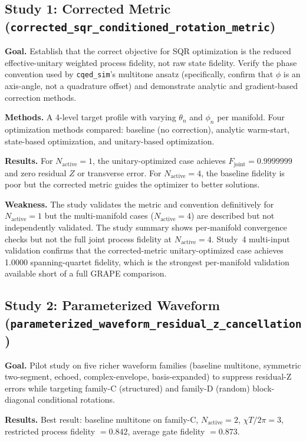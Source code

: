 \documentclass[11pt,letterpaper]{article}
\newcommand{\chiT}{\chi T / 2\pi}
\newcommand{\nact}{N_{\text{active}}}
\begin{document}
\subsection{Study 1: Corrected Metric (\texttt{corrected\_sqr\_conditioned\_rotation\_metric})}

\textbf{Goal.} Establish that the correct objective for SQR optimization is the
reduced effective-unitary weighted process fidelity, not raw state fidelity.
Verify the phase convention used by \texttt{cqed\_sim}'s multitone ansatz
(specifically, confirm that $\phi$ is an axis-angle, not a quadrature offset)
and demonstrate analytic and gradient-based correction methods.

\textbf{Methods.} A 4-level target profile with varying $\theta_n$ and $\phi_n$ per manifold.
Four optimization methods compared: baseline (no correction), analytic warm-start,
state-based optimization, and unitary-based optimization.

\textbf{Results.}  For $\nact = 1$, the unitary-optimized case achieves
$F_\text{joint} = 0.9999999$ and zero residual $Z$ or transverse error.
For $\nact = 4$, the baseline fidelity is poor but the corrected metric guides
the optimizer to better solutions.

\textbf{Weakness.}  The study validates the metric and convention definitively for
$\nact = 1$ but the multi-manifold cases ($\nact = 4$) are described but not
independently validated.  The study summary shows per-manifold convergence checks
but not the full joint process fidelity at $\nact = 4$.
Study~4 multi-input validation confirms that the corrected-metric
unitary-optimized case achieves 1.0000 spanning-quartet fidelity,
which is the strongest per-manifold validation available short of a full GRAPE comparison.

\subsection{Study 2: Parameterized Waveform (\texttt{parameterized\_waveform\_residual\_z\_cancellation})}

\textbf{Goal.}  Pilot study on five richer waveform families
(baseline multitone, symmetric two-segment, echoed, complex-envelope, basis-expanded)
to suppress residual-Z errors while targeting family-C (structured) and
family-D (random) block-diagonal conditional rotations.

\textbf{Results.}  Best result: baseline multitone on family-C, $\nact = 2$, $\chiT = 3$,
restricted process fidelity $= 0.842$, average gate fidelity $= 0.873$.
\end{document}
